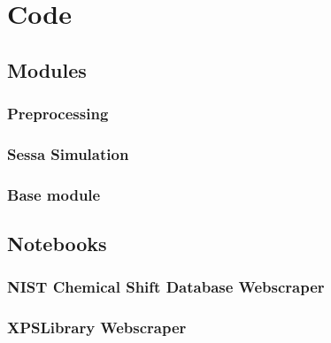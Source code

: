

\chapter{Code} %

\label{AppendixA} %

\section{Modules}

\subsection{Preprocessing}
\label{preprocessing}


\subsection{Sessa Simulation}
\label{Sessa_Module}


\subsection{Base module}
\label{code:base}



\section{Notebooks}

\subsection{NIST Chemical Shift Database Webscraper}
\label{NIST_WebScraper}


\subsection{XPSLibrary Webscraper}
\label{xpslibrary_webscraper}



